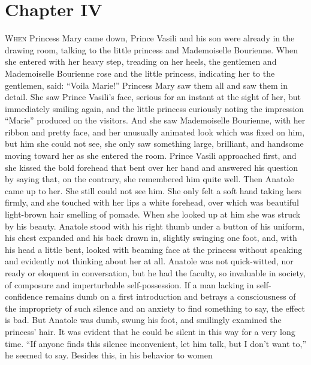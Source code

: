 \chapter*{Chapter IV}
\ifaudio     
{} 
\fi

\lettrine[lines=2, loversize=0.3, lraise=0]{\initfamily W}{hen}
 Princess Mary came down, Prince Vasili and his son were
already in the drawing room, talking to the little princess and
Mademoiselle Bourienne. When she entered with her heavy step,
treading on her heels, the gentlemen and Mademoiselle Bourienne
rose and the little princess, indicating her to the gentlemen,
said: ``Voila Marie!'' Princess Mary saw them all and saw them in
detail. She saw Prince Vasili's face, serious for an instant at
the sight of her, but immediately smiling again, and the little
princess curiously noting the impression ``Marie'' produced on
the visitors. And she saw Mademoiselle Bourienne, with her ribbon
and pretty face, and her unusually animated look which was fixed
on him, but him she could not see, she only saw something large,
brilliant, and handsome moving toward her as she entered the
room. Prince Vasili approached first, and she kissed the bold
forehead that bent over her hand and answered his question by
saying that, on the contrary, she remembered him quite well. Then
Anatole came up to her. She still could not see him. She only
felt a soft hand taking hers firmly, and she touched with her
lips a white forehead, over which was beautiful light-brown hair
smelling of pomade. When she looked up at him she was struck by
his beauty. Anatole stood with his right thumb under a button of
his uniform, his chest expanded and his back drawn in, slightly
swinging one foot, and, with his head a little bent, looked with
beaming face at the princess without speaking and evidently not
thinking about her at all.  Anatole was not quick-witted, nor
ready or eloquent in conversation, but he had the faculty, so
invaluable in society, of composure and imperturbable
self-possession. If a man lacking in self-confidence remains dumb
on a first introduction and betrays a consciousness of the
impropriety of such silence and an anxiety to find something to
say, the effect is bad. But Anatole was dumb, swung his foot, and
smilingly examined the princess' hair. It was evident that he
could be silent in this way for a very long time. ``If anyone
finds this silence inconvenient, let him talk, but I don't want
to,'' he seemed to say.  Besides this, in his behavior to women
